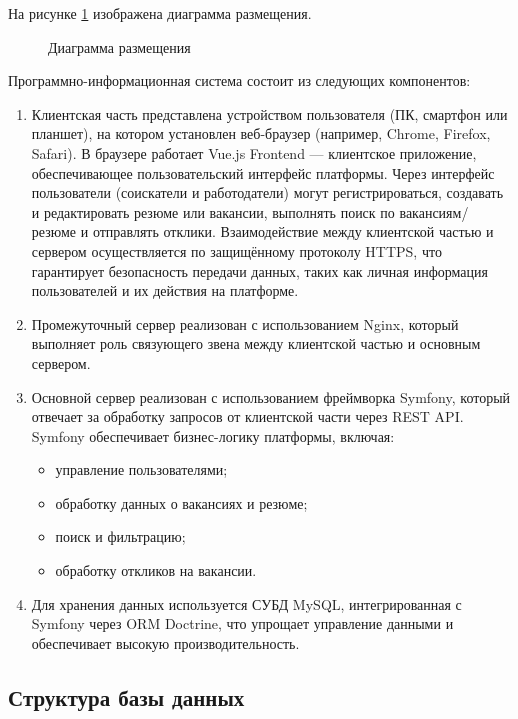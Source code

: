 На рисунке \ref{dc:image} изображена диаграмма размещения.

\begin{figure}[ht]
\center{\texttt{[image: dc]}}
\caption{Диаграмма размещения}
\label{dc:image}
\end{figure}

Программно-информационная система состоит из следующих компонентов:

\begin{enumerate}
	\item Клиентская часть представлена устройством пользователя (ПК, смартфон или планшет), на котором установлен веб-браузер (например, Chrome, Firefox, Safari). В браузере работает Vue.js Frontend — клиентское приложение, обеспечивающее пользовательский интерфейс платформы. Через интерфейс пользователи (соискатели и работодатели) могут регистрироваться, создавать и редактировать резюме или вакансии, выполнять поиск по вакансиям/резюме и отправлять отклики. Взаимодействие между клиентской частью и сервером осуществляется по защищённому протоколу HTTPS, что гарантирует безопасность передачи данных, таких как личная информация пользователей и их действия на платформе.
	\item Промежуточный сервер реализован с использованием Nginx, который выполняет роль связующего звена между клиентской частью и основным сервером.
	\item Основной сервер реализован с использованием фреймворка Symfony, который отвечает за обработку запросов от клиентской части через REST API. Symfony обеспечивает бизнес-логику платформы, включая:
	
	\begin{itemize}
		\item управление пользователями;
		\item обработку данных о вакансиях и резюме;
		\item поиск и фильтрацию;
		\item обработку откликов на вакансии.
	\end{itemize}
	
	\item Для хранения данных используется СУБД MySQL, интегрированная с Symfony через ORM Doctrine, что упрощает управление данными и обеспечивает высокую производительность.
\end{enumerate}

\subsection{Структура базы данных}

